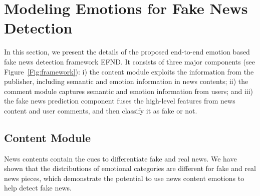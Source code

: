 \documentclass[conference]{IEEEtran}
\newcommand{\m}{EFND}
\begin{document}
	\section{Modeling Emotions for Fake News Detection}
	
	In this section, we present the details of  the proposed end-to-end emotion based fake news detection framework {\m}. It consists of three major components (see Figure~\ref{Fig:framework}): i) the content module exploits the information from the publisher, including semantic and emotion information in news contents;  ii) the comment module captures semantic and emotion information from users; and iii) the fake news prediction component fuses the high-level features from news content and user comments, and then classify it as fake or not. 
	
	\subsection{Content  Module}
	News contents contain the cues to differentiate fake and real news. We have shown that the distributions of emotional categories are different for fake and real news pieces, which demonstrate the potential to use news content emotions to help detect fake news. 
	
	
\end{document}
